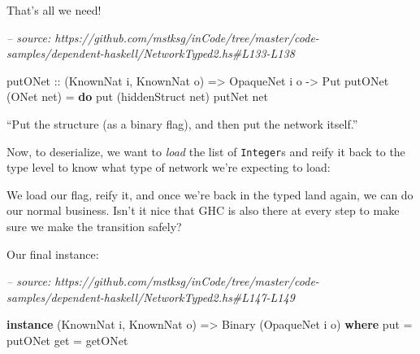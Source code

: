 \documentclass[]{article}
\newenvironment{Shaded}{}{}
\newcommand{\CommentTok}[1]{\textcolor[rgb]{0.38,0.63,0.69}{\textit{#1}}}
\newcommand{\DataTypeTok}[1]{\textcolor[rgb]{0.56,0.13,0.00}{#1}}
\newcommand{\FunctionTok}[1]{\textcolor[rgb]{0.02,0.16,0.49}{#1}}
\newcommand{\KeywordTok}[1]{\textcolor[rgb]{0.00,0.44,0.13}{\textbf{#1}}}
\newcommand{\NormalTok}[1]{#1}
\newcommand{\OtherTok}[1]{\textcolor[rgb]{0.00,0.44,0.13}{#1}}
\begin{document}
That's all we need!

\begin{Shaded}
\begin{Highlighting}[]
\CommentTok{-- source: https://github.com/mstksg/inCode/tree/master/code-samples/dependent-haskell/NetworkTyped2.hs#L133-L138}

\OtherTok{putONet ::}\NormalTok{ (}\DataTypeTok{KnownNat}\NormalTok{ i, }\DataTypeTok{KnownNat}\NormalTok{ o)}
        \OtherTok{=>} \DataTypeTok{OpaqueNet}\NormalTok{ i o}
        \OtherTok{->} \DataTypeTok{Put}
\NormalTok{putONet (}\DataTypeTok{ONet}\NormalTok{ net) }\FunctionTok{=} \KeywordTok{do}
\NormalTok{    put (hiddenStruct net)}
\NormalTok{    putNet net}
\end{Highlighting}
\end{Shaded}

``Put the structure (as a binary flag), and then put the network itself.''

Now, to deserialize, we want to \emph{load} the list of \texttt{Integer}s and
reify it back to the type level to know what type of network we're expecting to
load:

\begin{Shaded}
\end{Shaded}

We load our flag, reify it, and once we're back in the typed land again, we can
do our normal business. Isn't it nice that GHC is also there at every step to
make sure we make the transition safely?

Our final instance:

\begin{Shaded}
\begin{Highlighting}[]
\CommentTok{-- source: https://github.com/mstksg/inCode/tree/master/code-samples/dependent-haskell/NetworkTyped2.hs#L147-L149}

\KeywordTok{instance}\NormalTok{ (}\DataTypeTok{KnownNat}\NormalTok{ i, }\DataTypeTok{KnownNat}\NormalTok{ o) }\OtherTok{=>} \DataTypeTok{Binary}\NormalTok{ (}\DataTypeTok{OpaqueNet}\NormalTok{ i o) }\KeywordTok{where}
\NormalTok{    put }\FunctionTok{=}\NormalTok{ putONet}
\NormalTok{    get }\FunctionTok{=}\NormalTok{ getONet}
\end{Highlighting}
\end{Shaded}
\end{document}
